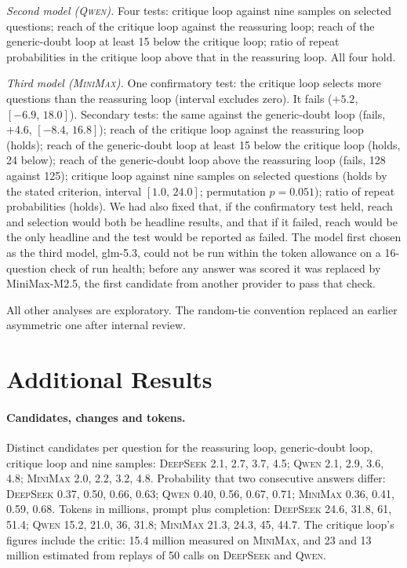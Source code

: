 \documentclass[11pt]{article}
\newcommand{\ds}{\textsc{DeepSeek}}
\newcommand{\qw}{\textsc{Qwen}}
\newcommand{\mm}{\textsc{MiniMax}}
\newcommand{\ci}[2]{$[#1,\,#2]$}
\begin{document}
\emph{Second model (\qw).}
Four tests: critique loop against nine samples on selected questions; reach of the critique loop against the reassuring loop; reach of the generic-doubt loop at least 15 below the critique loop; ratio of repeat probabilities in the critique loop above that in the reassuring loop.
All four hold.

\emph{Third model (\mm).}
One confirmatory test: the critique loop selects more questions than the reassuring loop (interval excludes zero).
It fails ($+5.2$, \ci{-6.9}{18.0}).
Secondary tests: the same against the generic-doubt loop (fails, $+4.6$, \ci{-8.4}{16.8}); reach of the critique loop against the reassuring loop (holds); reach of the generic-doubt loop at least 15 below the critique loop (holds, 24 below); reach of the generic-doubt loop above the reassuring loop (fails, 128 against 125); critique loop against nine samples on selected questions (holds by the stated criterion, interval \ci{1.0}{24.0}; permutation $p=0.051$); ratio of repeat probabilities (holds).
We had also fixed that, if the confirmatory test held, reach and selection would both be headline results, and that if it failed, reach would be the only headline and the test would be reported as failed.
The model first chosen as the third model, glm-5.3, could not be run within the token allowance on a 16-question check of run health; before any answer was scored it was replaced by MiniMax-M2.5, the first candidate from another provider to pass that check.

All other analyses are exploratory.
The random-tie convention replaced an earlier asymmetric one after internal review.

\section{Additional Results}
\label{app:more}

\paragraph{Candidates, changes and tokens.}
Distinct candidates per question for the reassuring loop, generic-doubt loop, critique loop and nine samples: \ds{} 2.1, 2.7, 3.7, 4.5; \qw{} 2.1, 2.9, 3.6, 4.8; \mm{} 2.0, 2.2, 3.2, 4.8.
Probability that two consecutive answers differ: \ds{} 0.37, 0.50, 0.66, 0.63; \qw{} 0.40, 0.56, 0.67, 0.71; \mm{} 0.36, 0.41, 0.59, 0.68.
Tokens in millions, prompt plus completion: \ds{} 24.6, 31.8, 61, 51.4; \qw{} 15.2, 21.0, 36, 31.8; \mm{} 21.3, 24.3, 45, 44.7.
The critique loop's figures include the critic: 15.4 million measured on \mm, and 23 and 13 million estimated from replays of 50 calls on \ds{} and \qw.
\end{document}
